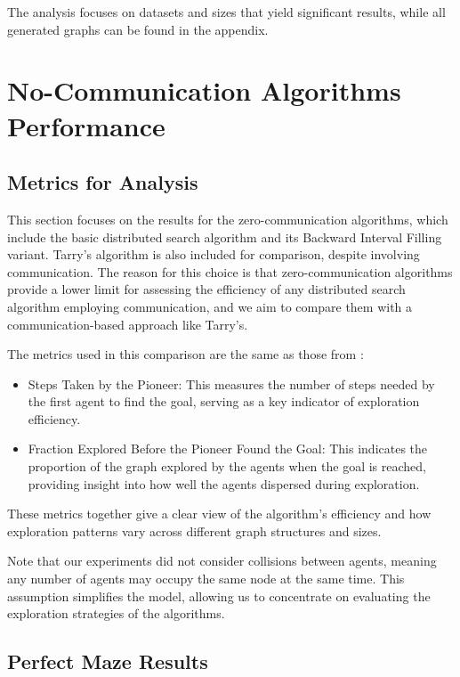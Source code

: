 The analysis focuses on datasets and sizes that yield significant results, while all generated graphs can be found in the appendix.


\section{No-Communication Algorithms Performance}
\label{section_result_no_comm}

\subsection{Metrics for Analysis}
\label{subsection_no_comm_metrics}

This section focuses on the results for the zero-communication algorithms, which include the basic distributed search algorithm and its Backward Interval Filling variant. Tarry's algorithm is also included for comparison, despite involving communication. The reason for this choice is that zero-communication algorithms provide a lower limit for assessing the efficiency of any distributed search algorithm employing communication, and we aim to compare them with a communication-based approach like Tarry's.


The metrics used in this comparison are the same as those from :

\begin{itemize}
    \item Steps Taken by the Pioneer: This measures the number of steps needed by the first agent to find the goal, serving as a key indicator of exploration efficiency.
    \item Fraction Explored Before the Pioneer Found the Goal: This indicates the proportion of the graph explored by the agents when the goal is reached, providing insight into how well the agents dispersed during exploration.
\end{itemize}
    
These metrics together give a clear view of the algorithm's efficiency and how exploration patterns vary across different graph structures and sizes.

Note that our experiments did not consider collisions between agents, meaning any number of agents may occupy the same node at the same time. This assumption simplifies the model, allowing us to concentrate on evaluating the exploration strategies of the algorithms.

\subsection{Perfect Maze Results} 
\label{subsection_no_comm_maze_results}



